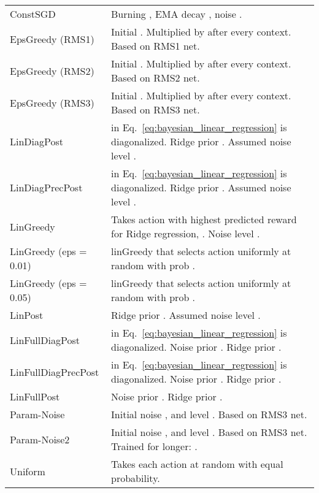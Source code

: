 \documentclass{article} \usepackage{iclr2018_conference,times}
\begin{document}
\begin{table}[ht]
\begin{tabular}{ll}
ConstSGD & Burning , EMA decay , noise . \\
EpsGreedy (RMS1) & Initial . Multiplied by  after every context. Based on RMS1 net. \\
EpsGreedy (RMS2) & Initial . Multiplied by  after every context. Based on RMS2 net. \\
EpsGreedy (RMS3) & Initial . Multiplied by  after every context. Based on RMS3 net. \\
LinDiagPost &  in Eq.~\ref{eq:bayesian_linear_regression} is diagonalized.  Ridge prior . Assumed noise level . \\
LinDiagPrecPost &  in Eq.~\ref{eq:bayesian_linear_regression} is diagonalized.  Ridge prior . Assumed noise level . \\
LinGreedy & Takes action with highest predicted reward for Ridge regression, . Noise level . \\
LinGreedy (eps = 0.01) & linGreedy that selects action uniformly at random with prob . \\
LinGreedy (eps = 0.05) & linGreedy that selects action uniformly at random with prob . \\
LinPost & Ridge prior . Assumed noise level . \\
LinFullDiagPost &  in Eq.~\ref{eq:bayesian_linear_regression} is diagonalized. Noise prior . Ridge prior . \\
LinFullDiagPrecPost &  in Eq.~\ref{eq:bayesian_linear_regression} is diagonalized. Noise prior . Ridge prior . \\
LinFullPost & Noise prior . Ridge prior . \\
Param-Noise & Initial noise , and level . Based on RMS3 net.  \\
Param-Noise2 & Initial noise , and level . Based on RMS3 net. Trained for longer: . \\
Uniform & Takes each action at random with equal probability. \\
    \bottomrule
  \end{tabular}
\end{table}
\end{document}
